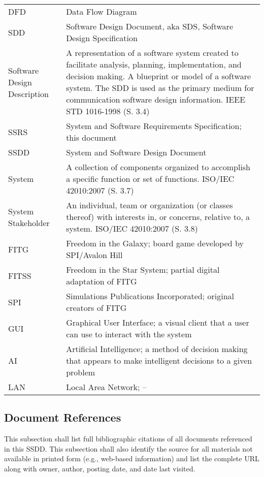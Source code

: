 \documentclass[twoside,letterpaper]{article}
\begin{document}
\begin{minipage}{\linewidth}
\begin{tabularx}{\textwidth}{lX}
DFD & Data Flow Diagram\\
SDD & Software Design Document, aka SDS, Software Design Specification\\
Software Design Description & A representation of a software system created to facilitate analysis, planning, implementation, and decision making.  A blueprint or model of a software system.  The SDD is used as the primary medium for communication software design information.  IEEE STD 1016-1998 (S. 3.4)\\ 
SSRS & System and Software Requirements Specification; this document\\
SSDD & System and Software Design Document\\
System & A collection of components organized to accomplish a specific function or set of functions.  ISO/IEC 42010:2007 (S. 3.7)\\
System Stakeholder & An individual, team or organization (or classes thereof) with interests in, or concerns, relative to, a system.  ISO/IEC 42010:2007 (S. 3.8)\\
FITG & Freedom in the Galaxy; board game developed by SPI/Avalon Hill\\
FITSS & Freedom in the Star System; partial digital adaptation of FITG\\
SPI & Simulations Publications Incorporated; original creators of FITG\\
GUI & Graphical User Interface; a visual client that a user can use to interact with the system\\
AI & Artificial Intelligence; a method of decision making that appears to make intelligent decisions to a given problem\\
LAN & Local Area Network; --\\

\bottomrule[1.5pt]
\end{tabularx}
\end{minipage}

\subsection{Document References}
This subsection shall list full bibliographic citations of all documents
referenced in this SSDD.  This subsection shall also identify the
source for all materials not available in printed form (e.g., web-based
information) and list the complete URL along with owner, author,
posting date, and date last visited.
\end{document}
